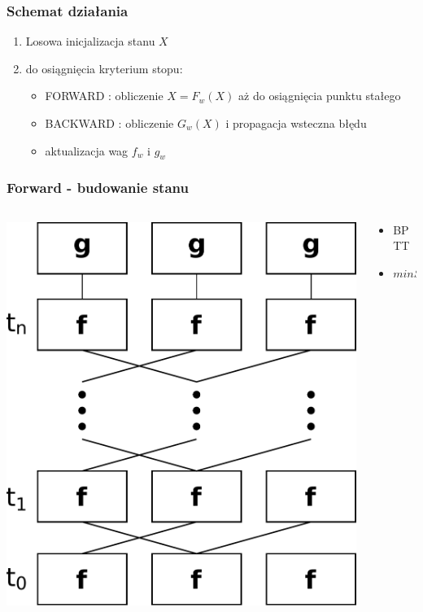 \documentclass{beamer}
\begin{document}
\begin{frame}
\frametitle{Schemat działania}
\begin{enumerate}
	\item Losowa inicjalizacja stanu $X$
	\item do osiągnięcia kryterium stopu:
	\begin{itemize}
		\item FORWARD : obliczenie $X = F_w(X)$ aż do osiągnięcia punktu stałego
		\item BACKWARD : obliczenie $G_w(X)$ i propagacja wsteczna błędu
		\item aktualizacja wag $f_w$ i $g_w$
	\end{itemize}
\end{enumerate}
\end{frame}

\begin{frame}
\frametitle{Forward - budowanie stanu}
\begin{columns}
	\begin{column}{0.66\textwidth}
		\includegraphics[scale=0.2]{img/forward}
	\end{column}
	\begin{column}{0.34\textwidth}
		\begin{itemize}
			\item BPTT
			\item $minStateDiff$
		\end{itemize}
	\end{column}
\end{columns}
\end{frame}
\end{document}
